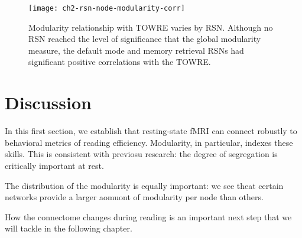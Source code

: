 \begin{figure}[t]
    \centering
    \texttt{[image: ch2-rsn-node-modularity-corr]}
    \caption[Modularity relationship with TOWRE varies by RSN.] {Modularity relationship with TOWRE varies by RSN. Although no RSN reached the level of significance that the global modularity measure, the default mode and memory retrieval RSNs had significant positive correlations with the TOWRE.}
    \label{fig:ch2-rsn-node-modularity-corr}
\end{figure}

\section{Discussion}

In this first section, we establish that resting-state fMRI can connect robustly to behavioral metrics of reading efficiency. Modularity, in particular, indexes these skills. This is consistent with previosu research: the degree of segregation is critically important at rest. 

The distribution of the modularity is equally important: we see theat certain networks provide a larger aomuont of modularity per node than others. 

How the connectome changes during reading is an important next step that we will tackle in the following chapter.